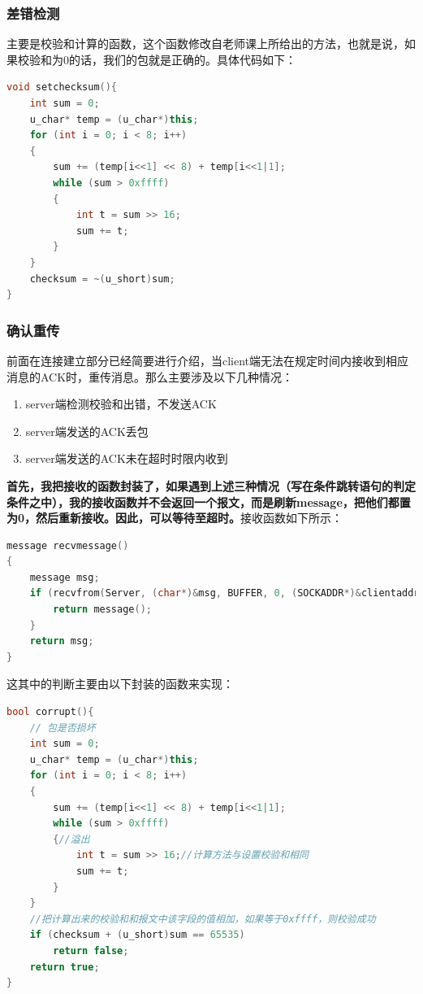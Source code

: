 \documentclass[UTF8,a4paper,10pt]{ctexart}
\begin{document}
\subsubsection{差错检测}
主要是校验和计算的函数，这个函数修改自老师课上所给出的方法，也就是说，如果校验和为0的话，我们的包就是正确的。具体代码如下：
\begin{lstlisting}[title=校验和计算,frame=trbl,language={C++}]
void setchecksum(){
    int sum = 0;
    u_char* temp = (u_char*)this;
    for (int i = 0; i < 8; i++)
    {
        sum += (temp[i<<1] << 8) + temp[i<<1|1];
        while (sum > 0xffff)
        {
            int t = sum >> 16;  
            sum += t;
        }
    }
    checksum = ~(u_short)sum;  
}
\end{lstlisting}

\subsubsection{确认重传}
前面在连接建立部分已经简要进行介绍，当client端无法在规定时间内接收到相应消息的ACK时，重传消息。那么主要涉及以下几种情况：
\begin{enumerate}
  \item server端检测校验和出错，不发送ACK
  \item server端发送的ACK丢包
  \item server端发送的ACK未在超时时限内收到
\end{enumerate}
\textbf{首先，我把接收的函数封装了，如果遇到上述三种情况（写在条件跳转语句的判定条件之中），我的接收函数并不会返回一个报文，而是刷新message，把他们都置为0，然后重新接收。因此，可以等待至超时。}接收函数如下所示：
\begin{lstlisting}[title=接收函数,frame=trbl,language={C++}]
message recvmessage()
{
    message msg;
    if (recvfrom(Server, (char*)&msg, BUFFER, 0, (SOCKADDR*)&clientaddr, &len) ==-1 || !msg.isEXT() || msg.corrupt()) {
        return message();
    }
    return msg;
}
\end{lstlisting}
这其中的判断主要由以下封装的函数来实现：
\begin{lstlisting}[title=检测,frame=trbl,language={C++}]
bool corrupt(){
    // 包是否损坏
    int sum = 0;
    u_char* temp = (u_char*)this;
    for (int i = 0; i < 8; i++)
    {
        sum += (temp[i<<1] << 8) + temp[i<<1|1];
        while (sum > 0xffff)
        {//溢出
            int t = sum >> 16;//计算方法与设置校验和相同
            sum += t;
        }
    }
    //把计算出来的校验和和报文中该字段的值相加，如果等于0xffff，则校验成功
    if (checksum + (u_short)sum == 65535)
        return false;
    return true;
}
\end{lstlisting}
\end{document}
